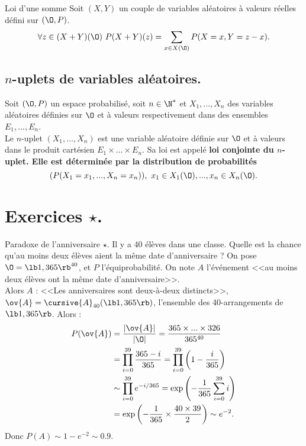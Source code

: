\documentclass[11pt]{article}
\begin{document}
\begin{prop}{Loi d'une somme}{}
    Soit $(X,Y)$ un couple de variables aléatoires à valeurs réelles défini sur $(\O,P)$.
    \begin{equation*}
        \forall z \in (X+Y)(\O) ~ P(X+Y)(z) = \sum_{x\in X(\O)}P(X=x,Y=z-x).
    \end{equation*}
\end{prop}

\subsection{\texorpdfstring{$n$}{Lg}-uplets de variables aléatoires.}

\begin{defi}{}{}
    Soit $(\O,P)$ un espace probabilisé, soit $n\in\N^*$ et $X_1,...,X_n$ des variables aléatoires définies sur $\O$ et à valeurs respectivement dans des ensembles $E_1,...,E_n$.\\
    Le $n$-uplet $(X_1,...,X_n)$ est une variable aléatoire définie sur $\O$ et à valeurs dans le produit cartésien $E_1\times...\times E_n$. Sa loi est appelé \bf{loi conjointe} du $n$-uplet. Elle est déterminée par la distribution de probabilités
    \begin{equation*}
        (P(X_1=x_1,...,X_n=x_n)), ~ x_1\in X_1(\O),...,x_n\in X_n(\O).
    \end{equation*}
\end{defi}

\section{Exercices \texorpdfstring{$\star$}{Lg}.}

\begin{exercice}{Paradoxe de l'anniversaire $\star$.}{}
    Il y a 40 élèves dans une classe. Quelle est la chance qu'au moins deux élèves aient la même date d'anniversaire ?
    \tcblower
    On pose $\O=\lb1,365\rb^{40}$, et $P$ l'équiprobabilité. On note $A$ l'événement <<au moins deux élèves ont la même date d'anniversaire>>.\\
    Alors $A$ : <<Les anniversaires sont deux-à-deux distincts>>, $\ov{A}=\cursive{A}_{40}(\lb1,365\rb)$, l'ensemble des 40-arrangements de $\lb1,365\rb$. Alors :
    \begin{align*}
        P(\ov{A})&=\frac{|\ov{A}|}{|\O|}=\frac{365\times...\times326}{365^{40}}\\&=\prod_{i=0}^{39}\frac{365-i}{365}=\prod_{i=0}^{39}\left( 1-\frac{i}{365}\right)\\&\sim\prod_{i=0}^{39}e^{-i/365}=\exp\left( -\frac{1}{365}\sum_{i=0}^{39}i \right)\\
        &=\exp\left( -\frac{1}{365}\times\frac{40\times39}{2} \right)\sim e^{-2}.
    \end{align*}
    Donc $P(A)\sim1-e^{-2}\sim0.9$.
\end{exercice}
\end{document}
